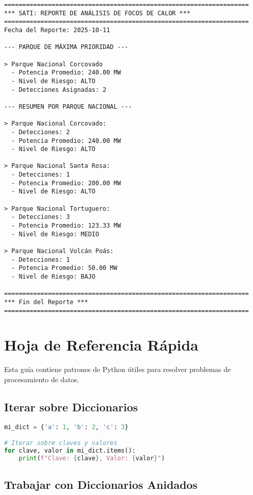 \documentclass[11pt,a4paper]{article}
\begin{document}
\begin{lstlisting}[language={},numbers=none,frame=single,basicstyle=\ttfamily\footnotesize]
===================================================================
*** SATI: REPORTE DE ANÁLISIS DE FOCOS DE CALOR ***
===================================================================
Fecha del Reporte: 2025-10-11

--- PARQUE DE MÁXIMA PRIORIDAD ---

> Parque Nacional Corcovado
  - Potencia Promedio: 240.00 MW
  - Nivel de Riesgo: ALTO
  - Detecciones Asignadas: 2

--- RESUMEN POR PARQUE NACIONAL ---

> Parque Nacional Corcovado:
  - Detecciones: 2
  - Potencia Promedio: 240.00 MW
  - Nivel de Riesgo: ALTO

> Parque Nacional Santa Rosa:
  - Detecciones: 1
  - Potencia Promedio: 200.00 MW
  - Nivel de Riesgo: ALTO

> Parque Nacional Tortuguero:
  - Detecciones: 3
  - Potencia Promedio: 123.33 MW
  - Nivel de Riesgo: MEDIO

> Parque Nacional Volcán Poás:
  - Detecciones: 1
  - Potencia Promedio: 50.00 MW
  - Nivel de Riesgo: BAJO

===================================================================
*** Fin del Reporte ***
===================================================================
\end{lstlisting}

\newpage

\section{Hoja de Referencia Rápida}

Esta guía contiene patrones de Python útiles para resolver problemas de procesamiento de datos.

\subsection{Iterar sobre Diccionarios}

\begin{lstlisting}[language=Python]
mi_dict = {'a': 1, 'b': 2, 'c': 3}

# Iterar sobre claves y valores
for clave, valor in mi_dict.items():
    print(f"Clave: {clave}, Valor: {valor}")
\end{lstlisting}

\subsection{Trabajar con Diccionarios Anidados}
\end{document}
